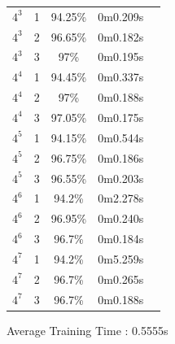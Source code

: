 \documentclass[]{report}
\begin{document}
\begin{center}
\begin{tabular}{lr|c|c|c}
			 $4^{3}$  &        1 & 94.25\%                             & 0m0.209s         \\
			 $4^{3}$  &        2 & 96.65\%                             & 0m0.182s         \\
			 $4^{3}$  &        3 & 97\%                                & 0m0.195s         \\
			 $4^{4}$  &        1 & 94.45\%                             & 0m0.337s         \\
			 $4^{4}$  &        2 & 97\%                                & 0m0.188s         \\
			 $4^{4}$  &        3 & 97.05\%                             & 0m0.175s         \\
			 $4^{5}$  &        1 & 94.15\%                             & 0m0.544s         \\
			 $4^{5}$  &        2 & 96.75\%                             & 0m0.186s         \\
			 $4^{5}$  &        3 & 96.55\%                             & 0m0.203s         \\
			 $4^{6}$  &        1 & 94.2\%                              & 0m2.278s         \\
			 $4^{6}$  &        2 & 96.95\%                             & 0m0.240s         \\
			 $4^{6}$  &        3 & 96.7\%                              & 0m0.184s         \\
			 $4^{7}$  &        1 & 94.2\%                              & 0m5.259s         \\
			 $4^{7}$  &        2 & 96.7\%                              & 0m0.265s         \\
			 $4^{7}$  &        3 & 96.7\%                              & 0m0.188s         \\
			 \hline
			\end{tabular}
		\end{center}

		Average Training Time : 0.5555s
\end{document}
